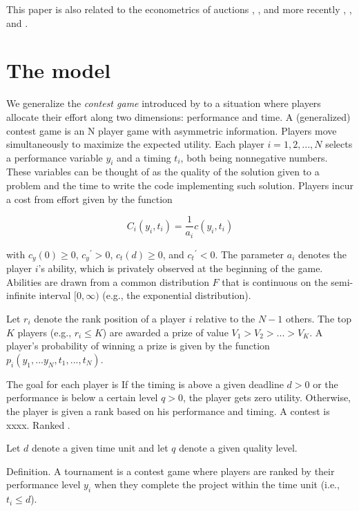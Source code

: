 \documentclass[12pt,]{article}
\begin{document}
This paper is also related to the econometrics of auctions
\citet{paarsch1992deciding}, \citet{laffont1995econometrics},
\citet{donald1996identification} and more recently
\citet{athey2011comparing}, \citet{athey2002identification}, and
\citet{athey2007nonparametric}.

\section{The model}\label{the-model}

We generalize the \emph{contest game} introduced by
\citet{moldovanu2001optimal} to a situation where players allocate their
effort along two dimensions: performance and time. A (generalized)
contest game is an N player game with asymmetric information. Players
move simultaneously to maximize the expected utility. Each player
\(i=1, 2, ..., N\) selects a performance variable \(y_i\) and a timing
\(t_i\), both being nonnegative numbers. These variables can be thought
of as the quality of the solution given to a problem and the time to
write the code implementing such solution. Players incur a cost from
effort given by the function

\begin{equation}
  C_i(y_i, t_i) = \frac{1}{a_i} c(y_i, t_i)
\end{equation}

with \({c_{y}}(0)\geq 0\), \({c_{y}}^\prime>0\), \({c_{t}}(d)\geq 0\),
and \({c_{t}}^\prime<0\). The parameter \(a_i\) denotes the player
\(i\)'s ability, which is privately observed at the beginning of the
game. Abilities are drawn from a common distribution \(F\) that is
continuous on the semi-infinite interval \([0,\infty)\) (e.g., the
exponential distribution).

Let \(r_i\) denote the rank position of a player \(i\) relative to the
\(N-1\) others. The top \(K\) players (e.g., \(r_i\leq K\)) are awarded
a prize of value \(V_1 > V_2 > ... > V_K\). A player's probability of
winning a prize is given by the function
\(p_i(y_1,...y_N, t_1, ..., t_N)\).

The goal for each player is If the timing is above a given deadline
\(d>0\) or the performance is below a certain level \(q>0\), the player
gets zero utility. Otherwise, the player is given a rank based on his
performance and timing. A contest is xxxx. Ranked .

Let \(d\) denote a given time unit and let \(q\) denote a given quality
level.

Definition. A tournament is a contest game where players are ranked by
their performance level \(y_i\) when they complete the project within
the time unit (i.e., \(t_i \leq d\)).
\end{document}
